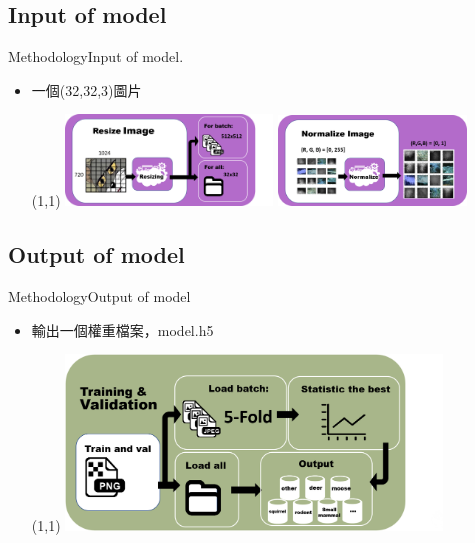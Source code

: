 \documentclass{beamer}
\begin{document}
\begin{CJK}{UTF8}{}
\subsection{Input of model}

\begin{frame}{Methodology}{Input of model}.
\vspace{-4.5cm}
	\begin{itemize}
	\item{
		一個(32,32,3)圖片
		\begin{textblock}{3}(1,1)
		\includegraphics[width=5.5cm]{resize.png}
		\includegraphics[width=5cm]{normalize.png}
		\end{textblock}
	}
	
	
	\end{itemize}
\end{frame}

\subsection{Output of model}

\begin{frame}{Methodology}{Output of model}
\vspace{-4.5cm}
	\begin{itemize}
	\item{
		輸出一個權重檔案，model.h5
		\begin{textblock}{3}(1,1)
		\includegraphics[width=10cm]{output.png}
		\end{textblock}
	}
	\end{itemize}
\end{frame}


\end{CJK}
\end{document}
